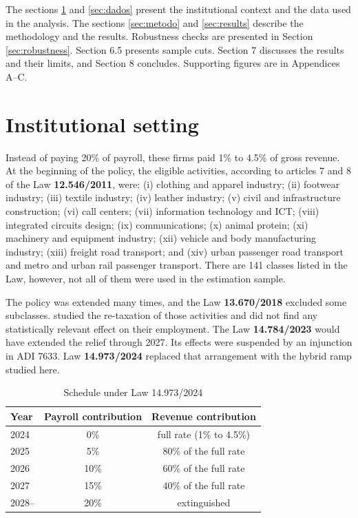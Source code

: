 \documentclass[12pt,a4paper]{article}
\begin{document}
The sections \ref{sec:contexto} and \ref{sec:dados} present the institutional context and the data used in the analysis. The sections \ref{sec:metodo} and \ref{sec:results} describe the methodology and the results. Robustness checks are presented in Section \ref{sec:robustness}. Section 6.5 presents sample cuts. Section 7 discusses the results and their limits, and Section 8 concludes. Supporting figures are in Appendices A--C.

\section{Institutional setting}
\label{sec:contexto}

Instead of paying 20\% of payroll, these firms paid 1\% to 4.5\% of gross revenue. At the beginning of the policy, the eligible activities, according to articles 7 and 8 of the Law \textbf{12.546/2011}, were: (i) clothing and apparel industry; (ii) footwear industry; (iii) textile industry; (iv) leather industry; (v) civil and infrastructure construction; (vi) call centers; (vii) information technology and ICT; (viii) integrated circuits design; (ix) communications; (x) animal protein; (xi) machinery and equipment industry; (xii) vehicle and body manufacturing industry; (xiii) freight road transport; and (xiv) urban passenger road transport and metro and urban rail passenger transport. There are 141 classes listed in the Law, however, not all of them were used in the estimation sample.

The policy was extended many times, and the Law \textbf{13.670/2018} excluded some subclasses. \cite{albernaz2025} studied the re-taxation of those activities and did not find any statistically relevant effect on their employment. The Law \textbf{14.784/2023} would have extended the relief through 2027. Its effects were suspended by an injunction in ADI 7633. Law \textbf{14.973/2024} replaced that arrangement with the hybrid ramp studied here.

\begin{table}[H]
\centering
\caption{Schedule under Law 14.973/2024}
\label{tab:cronograma}
\begin{tabular}{lcc}
\toprule
Year & Payroll contribution & Revenue contribution \\
\midrule
2024 & 0\% & full rate (1\% to 4.5\%) \\
2025 & 5\% & 80\% of the full rate \\
2026 & 10\% & 60\% of the full rate \\
2027 & 15\% & 40\% of the full rate \\
2028-- & 20\% & extinguished \\
\bottomrule
\end{tabular}
\end{table}
\end{document}
